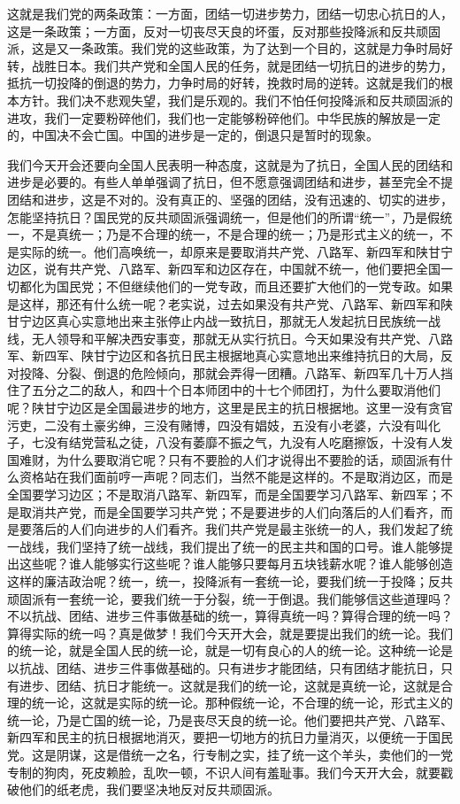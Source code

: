 这就是我们党的两条政策：一方面，团结一切进步势力，团结一切忠心抗日的人，这是一条政策；一方面，反对一切丧尽天良的坏蛋，反对那些投降派和反共顽固派，这是又一条政策。我们党的这些政策，为了达到一个目的，这就是力争时局好转，战胜日本。我们共产党和全国人民的任务，就是团结一切抗日的进步的势力，抵抗一切投降的倒退的势力，力争时局的好转，挽救时局的逆转。这就是我们的根本方针。我们决不悲观失望，我们是乐观的。我们不怕任何投降派和反共顽固派的进攻，我们一定要粉碎他们，我们也一定能够粉碎他们。中华民族的解放是一定的，中国决不会亡国。中国的进步是一定的，倒退只是暂时的现象。

我们今天开会还要向全国人民表明一种态度，这就是为了抗日，全国人民的团结和进步是必要的。有些人单单强调了抗日，但不愿意强调团结和进步，甚至完全不提团结和进步，这是不对的。没有真正的、坚强的团结，没有迅速的、切实的进步，怎能坚持抗日？国民党的反共顽固派强调统一，但是他们的所谓“统一”，乃是假统一，不是真统一；乃是不合理的统一，不是合理的统一；乃是形式主义的统一，不是实际的统一。他们高唤统一，却原来是要取消共产党、八路军、新四军和陕甘宁边区，说有共产党、八路军、新四军和边区存在，中国就不统一，他们要把全国一切都化为国民党；不但继续他们的一党专政，而且还要扩大他们的一党专政。如果是这样，那还有什么统一呢？老实说，过去如果没有共产党、八路军、新四军和陕甘宁边区真心实意地出来主张停止内战一致抗日，那就无人发起抗日民族统一战线，无人领导和平解决西安事变，那就无从实行抗日。今天如果没有共产党、八路军、新四军、陕甘宁边区和各抗日民主根据地真心实意地出来维持抗日的大局，反对投降、分裂、倒退的危险倾向，那就会弄得一团糟。八路军、新四军几十万人挡住了五分之二的敌人，和四十个日本师团中的十七个师团打，为什么要取消他们呢？陕甘宁边区是全国最进步的地方，这里是民主的抗日根据地。这里一没有贪官污吏，二没有土豪劣绅，三没有赌博，四没有娼妓，五没有小老婆，六没有叫化子，七没有结党营私之徒，八没有萎靡不振之气，九没有人吃磨擦饭，十没有人发国难财，为什么要取消它呢？只有不要脸的人们才说得出不要脸的话，顽固派有什么资格站在我们面前哼一声呢？同志们，当然不能是这样的。不是取消边区，而是全国要学习边区；不是取消八路军、新四军，而是全国要学习八路军、新四军；不是取消共产党，而是全国要学习共产党；不是要进步的人们向落后的人们看齐，而是要落后的人们向进步的人们看齐。我们共产党是最主张统一的人，我们发起了统一战线，我们坚持了统一战线，我们提出了统一的民主共和国的口号。谁人能够提出这些呢？谁人能够实行这些呢？谁人能够只要每月五块钱薪水呢？谁人能够创造这样的廉洁政治呢？统一，统一，投降派有一套统一论，要我们统一于投降；反共顽固派有一套统一论，要我们统一于分裂，统一于倒退。我们能够信这些道理吗？不以抗战、团结、进步三件事做基础的统一，算得真统一吗？算得合理的统一吗？算得实际的统一吗？真是做梦！我们今天开大会，就是要提出我们的统一论。我们的统一论，就是全国人民的统一论，就是一切有良心的人的统一论。这种统一论是以抗战、团结、进步三件事做基础的。只有进步才能团结，只有团结才能抗日，只有进步、团结、抗日才能统一。这就是我们的统一论，这就是真统一论，这就是合理的统一论，这就是实际的统一论。那种假统一论，不合理的统一论，形式主义的统一论，乃是亡国的统一论，乃是丧尽天良的统一论。他们要把共产党、八路军、新四军和民主的抗日根据地消灭，要把一切地方的抗日力量消灭，以便统一于国民党。这是阴谋，这是借统一之名，行专制之实，挂了统一这个羊头，卖他们的一党专制的狗肉，死皮赖脸，乱吹一顿，不识人间有羞耻事。我们今天开大会，就要戳破他们的纸老虎，我们要坚决地反对反共顽固派。


